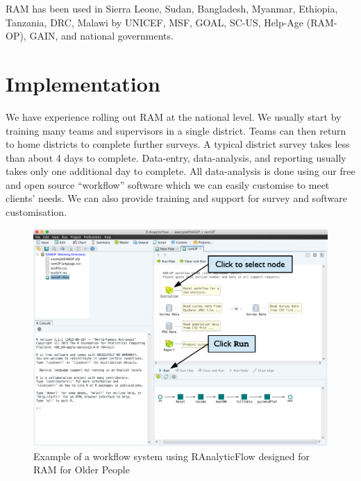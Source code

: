 \documentclass[12pt,a4paper]{article}
\begin{document}
RAM has been used in Sierra Leone, Sudan, Bangladesh, Myanmar, Ethiopia, Tanzania, DRC, Malawi by UNICEF, MSF, GOAL, SC-US, Help-Age (RAM-OP), GAIN, and national governments.

\newpage

\hypertarget{implementation}{%
\section{Implementation}\label{implementation}}

We have experience rolling out RAM at the national level. We usually start by training many teams and supervisors in a single district. Teams can then return to home districts to complete further surveys. A typical district survey takes less than about 4 days to complete. Data-entry, data-analysis, and reporting usually takes only one additional day to complete. All data-analysis is done using our free and open source ``workflow'' software which we can easily customise to meet clients' needs. We can also provide training and support for survey and software customisation.

\begin{figure}

{\centering \includegraphics[width=13.89in]{figures/runWorkflowRAF} 

}

\caption{Example of a workflow system using RAnalyticFlow designed for RAM for Older People}\label{fig:workflow1}
\end{figure}
\end{document}
